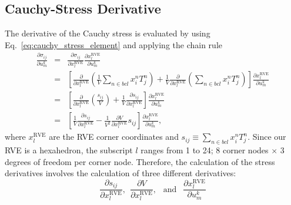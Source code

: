 \documentclass[12pt,aps,pre]{revtex4}
\begin{document}
\subsection{Cauchy-Stress Derivative}
%
The derivative of the Cauchy stress is evaluated by using Eq.\ \eqref{eq:cauchy_stress_element} and applying the chain rule
%
\begin{eqnarray}
\frac{\partial \sigma_{ij}}{\partial  u^k_m}  &=& \frac{\partial \sigma_{ij}}{\partial x_l^{\text{RVE}}} \frac{\partial x_l^{\text{RVE}}}{\partial u^k_m} \nonumber\\
%
&=& \left [ \frac{\partial}{\partial x^{\text{RVE}}_l}  \left(\frac{1}{V} \sum_{n \in bcl} x_i^{n} T_j^{n}\right)+ \frac{1}{V} \frac{\partial}{\partial x^{\text{RVE}}_l} \left(\sum_{n \in bcl} x_i^{n} T_j^{n} \right) \right] \frac{\partial x_l^{\text{RVE}}}{\partial u^k_m} \nonumber\\
%
&=&  \left[\frac{\partial}{\partial x^{\text{RVE}}_l}  \left(\frac{s_{ij}}{V} \right) + \frac{1}{V} \frac{\partial s_{ij}}{\partial x^{\text{RVE}}_l}\right]\frac{\partial x_l^{\text{RVE}}}{\partial u^k_m} \nonumber\\
%
&=& \left[\frac{1}{V} \frac{\partial s_{ij}}{\partial x^{\text{RVE}}_l} -\frac{1}{V^2}\frac{\partial V}{\partial x^{\text{RVE}}_l}s_{ij} \right]\frac{\partial x_l^{\text{RVE}}}{\partial u^k_m},
\end{eqnarray}
%
where $x_l^{\text{RVE}}$ are the RVE corner coordinates and $s_{ij} \equiv \sum_{n \in bcl} x^n_i T^n_j$. Since our RVE is a hexahedron, the subscript $l$ ranges from 1 to 24; 8 corner nodes $\times$ 3 degrees of freedom per corner node.  Therefore, the calculation of the stress derivatives involves the calculation of three different derivatives:
%
\begin{equation}
\frac{\partial s_{ij}}{\partial x_l^{\text{RVE}} }, \ \
\frac{\partial V}{\partial x_l^{\text{RVE}}}, \ \ \text{ and } \ \ 
\frac{\partial x_l^{\text{RVE}}}{\partial u^k_m}
\end{equation}
%
\end{document}
